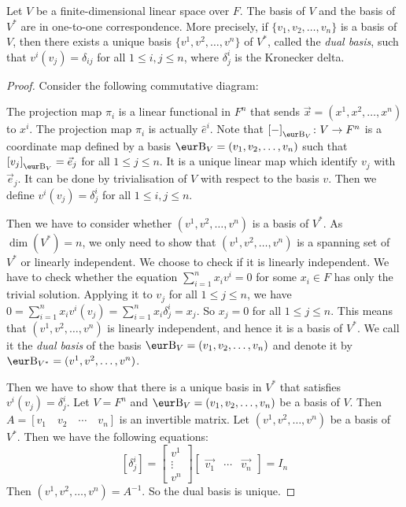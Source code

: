 \begin{proposition}\label{prop:dual_basis}
  Let $V$ be a finite-dimensional linear space over $F$. The basis of $V$ and the basis of $V^*$ are in one-to-one correspondence. More precisely, if $\{ v_1, v_2, \ldots, v_n \}$ is a basis of $V$, then there exists a unique basis $\{ v^1, v^2, \ldots, v^n \}$ of $V^*$, called the \emph{dual basis}, such that $v^i(v_j) = \delta_{ij}$ for all $1 \leq i, j \leq n$, where $\delta^i_j$ is the Kronecker delta.
\end{proposition}
\begin{proof}
  Consider the following commutative diagram:
  \begin{center}
  \end{center}
  The projection map $\pi_i$ is a linear functional in $F^n$ that sends $\vec{x} = (x^1, x^2, \ldots, x^n)$ to $x^i$. The projection map $\pi_i$ is actually $\hat{e}^i$. Note that ${[-]}_{\B_V} \colon V \to F^n$ is a coordinate map defined by a basis $\B_V = (v_1, v_2, \ldots, v_n)$ such that ${[v_j]}_{\B_V} = \vec{e}_j$ for all $1 \leq j \leq n$. It is a unique linear map which identify $v_j$ with $\vec{e}_j$. It can be done by trivialisation of $V$ with respect to the basis $v$. Then we define $v^i(v_j) = \delta^i_j$ for all $1 \leq i, j \leq n$.

  Then we have to consider whether $(v^1, v^2, \ldots, v^n)$ is a basis of $V^*$. As $\dim(V^*) = n$, we only need to show that $(v^1, v^2, \ldots, v^n)$ is a spanning set of $V^*$ or linearly independent. We choose to check if it is linearly independent. We have to check whether the equation $\sum_{i=1}^n x_i v^i = 0$ for some $x_i \in F$ has only the trivial solution. Applying it to $v_j$ for all $1 \leq j \leq n$, we have $0 = \sum_{i=1}^n x_i v^i(v_j) = \sum_{i=1}^n x_i \delta_j^i = x_j$. So $x_j = 0$ for all $1 \leq j \leq n$. This means that $(v^1, v^2, \ldots, v^n)$ is linearly independent, and hence it is a basis of $V^*$. We call it the \emph{dual basis} of the basis $\B_V = (v_1, v_2, \ldots, v_n)$ and denote it by $\B_{V^*} = (v^1, v^2, \ldots, v^n)$.

  Then we have to show that there is a unique basis in $V^*$ that satisfies $v^i(v_j) = \delta^i_j$. Let $V = F^n$ and $\B_V = (v_1, v_2, \ldots, v_n)$ be a basis of $V$. Then $A = [v_1 \quad v_2 \quad \cdots \quad v_n]$ is an invertible matrix. Let $(v^1, v^2, \ldots, v^n)$ be a basis of $V^*$. Then we have the following equations:
  \[
    [ \delta^i_j ] = \begin{bmatrix} v^1 \\ \vdots \\ v^n \end{bmatrix} \begin{bmatrix} \vec{v_1} & \cdots & \vec{v_n} \end{bmatrix} = I_n
  \]
  Then $(v^1, v^2, \ldots, v^n) = A^{-1}$. So the dual basis is unique.
\end{proof}

